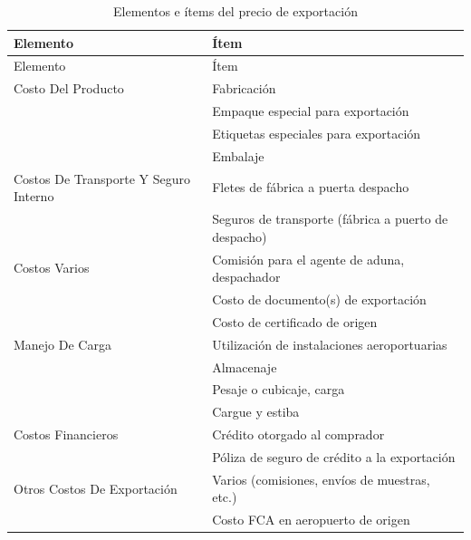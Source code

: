 \documentclass[
  stu,
  floatsintext,
  longtable,
  a4paper,
  nolmodern,
  notxfonts,
  notimes,
  12pt,
  colorlinks=true,linkcolor=blue,citecolor=blue,urlcolor=blue]{apa7}
\begin{document}
\begin{longtable}[]{@{}
  >{\raggedright\arraybackslash}p{}
  >{\raggedright\arraybackslash}p{}@{}}
\caption{Elementos e ítems del precio de exportación}\tabularnewline
\toprule\noalign{}
\begin{minipage}[b]{\linewidth}\raggedright
Elemento
\end{minipage} & \begin{minipage}[b]{\linewidth}\raggedright
Ítem
\end{minipage} \\
\midrule\noalign{}
\endfirsthead
\toprule\noalign{}
\begin{minipage}[b]{\linewidth}\raggedright
Elemento
\end{minipage} & \begin{minipage}[b]{\linewidth}\raggedright
Ítem
\end{minipage} \\
\midrule\noalign{}
\endhead
\bottomrule\noalign{}
\endlastfoot
Costo Del Producto & Fabricación \\
& Empaque especial para exportación \\
& Etiquetas especiales para exportación \\
& Embalaje \\
Costos De Transporte Y Seguro Interno & Fletes de fábrica a puerta
despacho \\
& Seguros de transporte (fábrica a puerto de despacho) \\
Costos Varios & Comisión para el agente de aduna, despachador \\
& Costo de documento(s) de exportación \\
& Costo de certificado de origen \\
Manejo De Carga & Utilización de instalaciones aeroportuarias \\
& Almacenaje \\
& Pesaje o cubicaje, carga \\
& Cargue y estiba \\
Costos Financieros & Crédito otorgado al comprador \\
& Póliza de seguro de crédito a la exportación \\
Otros Costos De Exportación & Varios (comisiones, envíos de muestras,
etc.) \\
& Costo FCA en aeropuerto de origen \\
\end{longtable}
\end{document}
